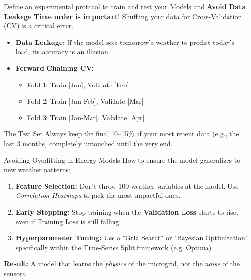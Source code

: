 \begin{frame}{Define an experimental protocol to train and test your Models and \textbf{Avoid Data Leakage}}
    \textbf{Time order is important}! Shuffling your data for Cross-Validation (CV) is a critical error.
    \vspace{0.3cm}
    \begin{itemize}
        \item \textbf{Data Leakage:} If the model sees tomorrow's weather to predict today's load, its accuracy is an illusion.
        \item \textbf{Forward Chaining CV:}
        \begin{itemize}
            \item Fold 1: Train [Jan], Validate [Feb]
            \item Fold 2: Train [Jan-Feb], Validate [Mar]
            \item Fold 3: Train [Jan-Mar], Validate [Apr]
        \end{itemize}
    \end{itemize}
    \begin{block}{The Test Set}
        Always keep the final 10–15\% of your most recent data (e.g., the last 3 months) completely untouched until the very end.
    \end{block}
\end{frame}

\begin{frame}{Avoiding Overfitting in Energy Models}
    How to ensure the model generalizes to new weather patterns:
    \vspace{0.2cm}
    \begin{enumerate}
        \item \textbf{Feature Selection:} Don't throw 100 weather variables at the model. Use \textit{Correlation Heatmaps} to pick the most impactful ones.
        \item \textbf{Early Stopping:} Stop training when the \textbf{Validation Loss} starts to rise, even if Training Loss is still falling.
        \item \textbf{Hyperparameter Tuning:} Use a "Grid Search" or "Bayesian Optimization" specifically within the Time-Series Split framework (e.g. \href{https://optuna.org/}{\alert{\underline{Optuna}}})
    \end{enumerate}
    \vspace{0.2cm}
    \textbf{Result:} A model that learns the \textit{physics} of the microgrid, not the \textit{noise} of the sensors.
\end{frame}

